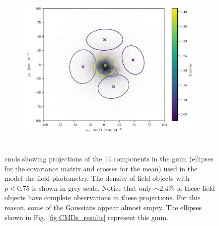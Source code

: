 \begin{figure}[ht!]
\begin{subfigure}[t]{0.48\textwidth}
        \caption{} 
    \end{subfigure}
     \begin{subfigure}[t]{0.48\textwidth}
      \includegraphics[page=5,height=8cm,width=\textwidth]{background/Figures/Field_GMM.pdf}
        \caption{}
    \end{subfigure}
\caption{\glspl{cmd} showing projections of the 14 components in the \gls{gmm} (ellipses for the covariance matrix and crosses for the mean) used in the model the field photometry. The density of field objects with $p <0.75$ \cite[according to][there are 98010 field objects]{Bouy2015} is shown in grey scale. Notice that only $\sim2.4\%$ of these field objects have complete observations in these projections. For this reason, some of the Gaussians appear almost empty. The ellipses shown in Fig. \ref{fig:CMDs_results} represent this \gls{gmm}.}
\label{fig:fphGMM}
\end{figure}

